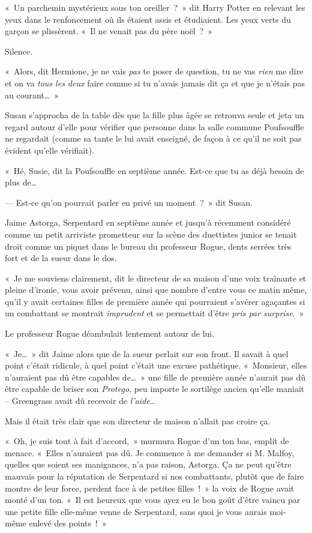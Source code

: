 \later

«~Un parchemin mystérieux sous ton oreiller~?~» dit Harry Potter en relevant les yeux dans le renfoncement où ils étaient assis et étudiaient. Les yeux verts du garçon se plissèrent. «~Il ne venait pas du père noël~?~»

Silence.

«~Alors, dit Hermione, je ne vais \emph{pas} te poser de question, tu ne vas \emph{rien} me dire et on va \emph{tous les deux} faire comme si tu n'avais jamais dit ça et que je n'étais pas au courant…~»

\later

Susan s'approcha de la table dès que la fille plus âgée se retrouva seule et jeta un regard autour d'elle pour vérifier que personne dans la salle commune Poufsouffle ne regardait (comme sa tante le lui avait enseigné, de façon à ce qu'il ne soit pas évident qu'elle vérifiait).

«~Hé, Susie, dit la Poufsouffle en septième année. Est-ce que tu as déjà besoin de plus de…

--- Est-ce qu'on pourrait parler en privé un moment~?~» dit Susan.

\later

Jaime Astorga, Serpentard en septième année et jusqu'à récemment considéré comme un petit arriviste prometteur sur la scène des duettistes junior se tenait droit comme un piquet dans le bureau du professeur Rogue, dents serrées très fort et de la sueur dans le dos.

«~Je me souviens clairement, dit le directeur de sa maison d'une voix traînante et pleine d'ironie, vous avoir prévenu, ainsi que nombre d'entre vous ce matin même, qu'il y avait certaines filles de première année qui pourraient s'avérer agaçantes si un combattant se montrait \emph{imprudent} et se permettait d'être \emph{pris par surprise}.~»

Le professeur Rogue déambulait lentement autour de lui.

«~Je…~» dit Jaime alors que de la sueur perlait sur son front. Il savait à quel point c'était ridicule, à quel point c'était une excuse pathétique. «~Monsieur, elles n'auraient pas dû être capables de…~» une fille de première année n'aurait pas dû être capable de briser son \emph{Protego}, peu importe le sortilège ancien qu'elle maniait -- Greengrass avait dû recevoir de \emph{l'aide}…

Mais il était très clair que son directeur de maison n'allait pas croire ça.

«~Oh, je suis tout à fait d'accord,~» murmura Rogue d'un ton bas, emplit de menace. «~Elles n'auraient pas dû. Je commence à me demander si M. Malfoy, quelles que soient ses manigances, n'a pas raison, Astorga. Ça ne peut qu'être mauvais pour la réputation de Serpentard si nos combattants, plutôt que de faire montre de leur force, perdent face à de petites filles~!~» la voix de Rogue avait monté d'un ton. «~Il est heureux que vous ayez eu le bon goût d'être vaincu par une petite fille elle-même venue de Serpentard, sans quoi je vous aurais moi-même enlevé des points~!~»

